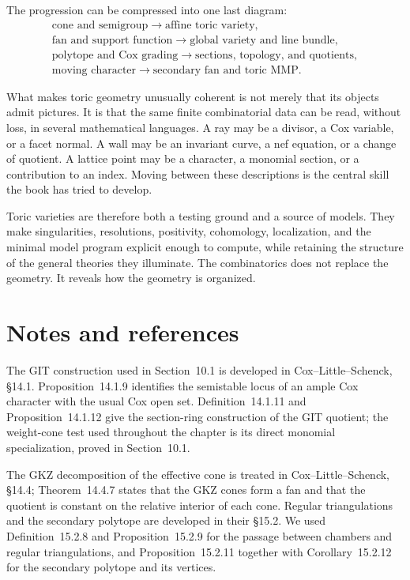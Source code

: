 The progression can be compressed into one last diagram:
\[
\boxed{
\begin{gathered}
\text{cone and semigroup}
\longrightarrow
\text{affine toric variety},
\\
\text{fan and support function}
\longrightarrow
\text{global variety and line bundle},
\\
\text{polytope and Cox grading}
\longrightarrow
\text{sections, topology, and quotients},
\\
\text{moving character}
\longrightarrow
\text{secondary fan and toric MMP}.
\end{gathered}}
\]

What makes toric geometry unusually coherent is not merely that its
objects admit pictures.  It is that the same finite combinatorial data
can be read, without loss, in several mathematical languages.  A ray
may be a divisor, a Cox variable, or a facet normal.  A wall may be an
invariant curve, a nef equation, or a change of quotient.  A lattice
point may be a character, a monomial section, or a contribution to an
index.  Moving between these descriptions is the central skill the
book has tried to develop.

Toric varieties are therefore both a testing ground and a source of
models.  They make singularities, resolutions, positivity,
cohomology, localization, and the minimal model program explicit
enough to compute, while retaining the structure of the general
theories they illuminate.  The combinatorics does not replace the
geometry.  It reveals how the geometry is organized.

\clearpage
\section*{Notes and references}

The GIT construction used in Section~10.1 is developed in
Cox--Little--Schenck, \S14.1.  Proposition~14.1.9 identifies the
semistable locus of an ample Cox character with the usual Cox open
set.  Definition~14.1.11 and Proposition~14.1.12 give the
section-ring construction of the GIT quotient; the weight-cone test
used throughout the chapter is its direct monomial specialization,
proved in Section~10.1.

The GKZ decomposition of the effective cone is treated in
Cox--Little--Schenck, \S14.4; Theorem~14.4.7 states that the GKZ cones
form a fan and that the quotient is constant on the relative interior
of each cone.  Regular triangulations and the secondary polytope are
developed in their \S15.2.  We used Definition~15.2.8 and
Proposition~15.2.9 for the passage between chambers and regular
triangulations, and Proposition~15.2.11 together with
Corollary~15.2.12 for the secondary polytope and its vertices.

